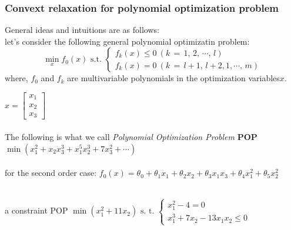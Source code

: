 \subsubsection{Convext relaxation for polynomial optimization problem}
General ideas and intuitions are as follows: \\
let's consider the following general polynomial optimizatin problem:
\[
\min\limits_{x} f_0(x) \text{ s.t. } 
\begin{cases}
f_k(x) \leq 0\: (k\,=\,1,\,2,\, \cdots,\, l)\\
f_k(x) = 0\: (k\,=\,l+1,\,l+2,1,\cdots,\, m)
\end{cases}
\]
where, $f_0$ and $f_k$ are multivariable polynomials in the optimization variables$x$.

\begin{example}[Example 1]
\(
x =
\begin{bmatrix}
    x_1 \\
    x_2 \\
    x_3
\end{bmatrix}
\)\\ \\
The following is what we call \textit{Polynomial Optimization Problem} \textbf{POP}\\
\(
\min (x_1^2 + x_2x_3^3 + x_1^5x_2^3 + 7x_3^2 + \cdots)
\)\\ \\
for the second order case:
\(
f_0(x) = \theta_0 + \theta_1x_1 + \theta_2x_2 + \theta_3x_1x_3 + \theta_4x_1^2 + \theta_5x_2^2
\)\\ \\
\end{example}

\begin{example}[Example 2]
a constraint POP
\(
\min (x_1^2 + 11x_2) \text{ s. t. } 
\begin{cases}
x_1^2 - 4 = 0 \\
x_1^3 + 7x_2 - 13x_1x_2 \leq 0
\end{cases}
\)\\ \\
\end{example}

